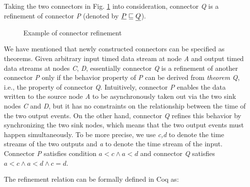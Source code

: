 \documentclass{llncs}
\begin{document}
\begin{example}[Refinement]
\label{ex:refine}
Taking the two connectors in Fig. \ref{refine} into consideration, connector \emph{Q} is a refinement of connector \emph{P} (denoted by $\emph{P} \sqsubseteq \emph{Q}$).
\begin{figure}
\vspace{0cm}
\centering
{}
\caption{Example of connector refinement}
\label{refine}
\end{figure}

We have mentioned that newly constructed connectors can be specified as theorems. Given arbitrary input timed
data stream at node \emph{A} and output timed data streams at nodes \emph{C}, \emph{D}, essentially connector
\emph{Q} is a refinement of another connector \emph{P} only if the behavior property of \emph{P} can
be derived from \emph{theorem Q}, i.e., the property of connector \emph{Q}. Intuitively, connector \emph{P} enables the
data written to the source node \emph{A} to be asynchronously taken out via the two sink nodes \emph{C} and \emph{D}, but
it has no constraints on the relationship between the time of the two output events. On the other hand,
connector \emph{Q} refines this behavior by synchronizing the two sink nodes, which means that the two output
events must happen simultaneously. To be more precise, we use \emph{c,d} to denote the time streams of the two outputs
and \emph{a} to denote the time stream of the input. Connector \emph{P} satisfies condition $a<c\wedge a<d$ and
connector \emph{Q} satisfies $a<c\wedge a<d \wedge c=d$.

The refinement relation can be formally defined in Coq as:




\end{example}
\end{document}
